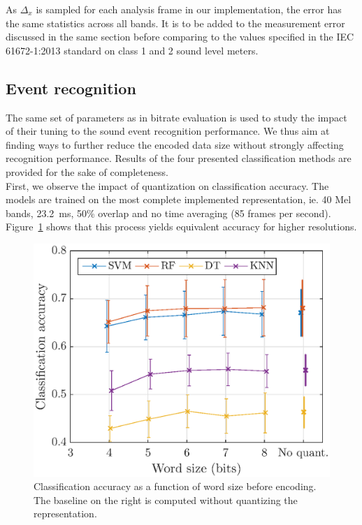 \documentclass[final,3p,times,twocolumn]{elsarticle}
\begin{document}
As $\Delta_x$ is sampled for each analysis frame in our implementation, the error has the same statistics across all bands. It is to be added to the measurement error discussed in the same section before comparing to the values specified in the IEC 61672-1:2013 \cite{iec-norm2} standard on class 1 and 2 sound level meters.

\subsection{Event recognition}

The same set of parameters as in bitrate evaluation is used to study the impact of their tuning to the sound event recognition performance. We thus aim at finding ways to further reduce the encoded data size without strongly affecting recognition performance. Results of the four presented classification methods are provided for the sake of completeness.\\

First, we observe the impact of quantization on classification accuracy. The models are trained on the most complete implemented representation, ie. 40 Mel bands, 23.2~ms, 50\% overlap and no time averaging (85 frames per second). Figure~\ref{fig:class_mel_q} shows that this process yields equivalent accuracy for higher resolutions.\\

\begin{figure}[htbp]
	\centering
		\includegraphics[width=\columnwidth]{figures/class_mel_q.eps}
	\caption{Classification accuracy as a function of word size before encoding. The baseline on the right is computed without quantizing the representation.}
	\label{fig:class_mel_q}
\end{figure}
\end{document}
